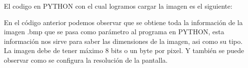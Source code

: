 El codigo en PYTHON con el cual logramos cargar la imagen es el siguiente:

\lstset{language=PYTHON}


En el c\'odigo anterior podemos observar que se obtiene toda la informaci\'on de la imagen .bmp que se pasa como par\'ametro al programa en PYTHON, esta informaci\'on nos sirve para saber las dimensiones de la imagen, asi como su tipo. La imagen debe de tener m\'aximo 8 bits o un byte por pixel. Y tambi\'en se puede observar como se configura la resoluci\'on de la pantalla.
